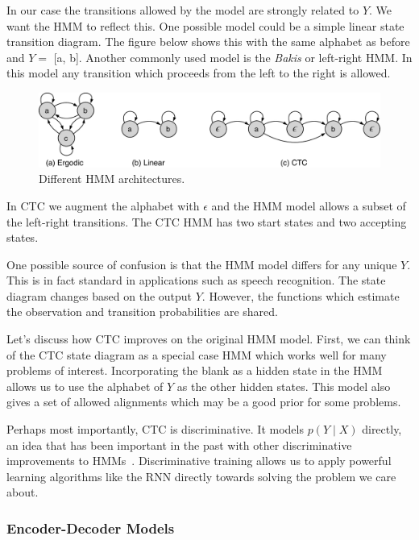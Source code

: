 In our case the transitions allowed by the model are strongly related to $Y$.
We want the HMM to reflect this. One possible model could be a simple linear
state transition diagram. The figure below shows this with the same alphabet as
before and $Y =$ [a, b]. Another commonly used model is the {\it Bakis} or
left-right HMM. In this model any transition which proceeds from the left to
the right is allowed.

\begin{figure}
    \centering
    \includegraphics[width=\textwidth]{background/figures/hmm_types.pdf}
    \caption{Different HMM architectures.}
\end{figure}

In CTC we augment the alphabet with $\epsilon$ and the HMM model allows a
subset of the left-right transitions. The CTC HMM has two start states and two
accepting states.

One possible source of confusion is that the HMM model differs for any unique
$Y$. This is in fact standard in applications such as speech recognition. The
state diagram changes based on the output $Y$. However, the functions which
estimate the observation and transition probabilities are shared.

Let's discuss how CTC improves on the original HMM model. First, we can think
of the CTC state diagram as a special case HMM which works well for many
problems of interest. Incorporating the blank as a hidden state in the HMM
allows us to use the alphabet of $Y$ as the other hidden states. This model
also gives a set of allowed alignments which may be a good prior for some
problems.

Perhaps most importantly, CTC is discriminative. It models $p(Y \mid X)$
directly, an idea that has been important in the past with other discriminative
improvements to HMMs~\cite{woodland2002}.  Discriminative training allows us to
apply powerful learning algorithms like the RNN directly towards solving the
problem we care about.

\subsubsection{Encoder-Decoder Models}

